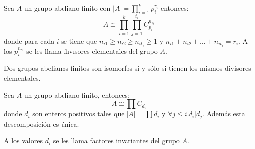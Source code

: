 \begin{theorem}
Sea $A$ un grupo abeliano finito con $|A| = \prod_{i = 1}^k p_i^{r_i}$ entonces: $$A \cong \prod_{i = 1}^k \prod_{j = 1}^{t_i} C_{p_i}^{n_{ij}}$$ donde para cada $i$ se tiene que $n_{i1} \ge n_{i2} \ge n_{it_i} \ge 1$ y $n_{i1} + n_{i2} + \ldots + n_{it_i} = r_i$. A los $p_i^{n_{ij}}$ se les llama divisores elementales del grupo $A$. 
\end{theorem}

\begin{corollary}
Dos grupos abelianos finitos son isomorfos si y sólo si tienen los mismos divisores elementales. 
\end{corollary}

\begin{example}

\end{example}

\begin{theorem}
Sea $A$ un grupo abeliano finito, entonces: $$A \cong \prod C_{d_i}$$ donde $d_i$ son enteros positivos tales que $|A| = \prod d_i$ y $\forall j \le i. d_i | d_j$. Además esta descomposición es única. 

A los valores $d_i$ se les llama factores invariantes del grupo $A$.  
\end{theorem}